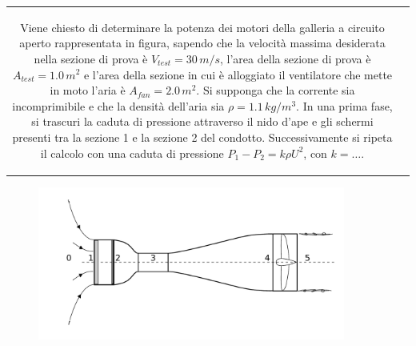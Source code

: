 \noindent
\begin{tabular}{cc}
\begin{minipage}{0.95\textwidth}
\begin{exerciseS}
 Viene chiesto di determinare la potenza dei motori della galleria a circuito aperto rappresentata in figura, sapendo che la velocità massima desiderata nella sezione di prova è $V_{test} = 30 \, m/s$, l'area della sezione di prova è $A_{test} = 1.0 \, m^2$ e l'area della sezione in cui è alloggiato il ventilatore che mette in moto l'aria è $A_{fan} = 2.0 \, m^2$. Si supponga che la corrente sia incomprimibile e che la densità dell'aria sia $\rho = 1.1 \, kg/m^3$. In una prima fase, si trascuri la caduta di pressione attraverso il nido d'ape e gli schermi presenti tra la sezione 1 e la sezione 2 del condotto. Successivamente si ripeta il calcolo con una caduta di pressione $P_1 - P_2 = k \rho U^2$, con $k = \dots$.
\end{exerciseS}
\end{minipage}
\end{tabular}
\begin{figure}[h!]
 \includegraphics[width=0.90\textwidth]{./fig/wt}
\end{figure}

\sol

